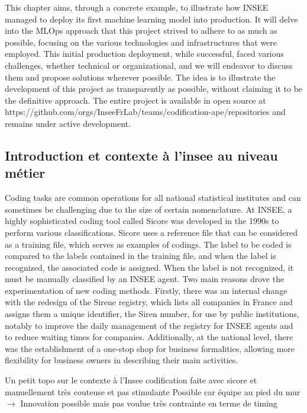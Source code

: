 This chapter aims, through a concrete example, to illustrate how INSEE managed to deploy its first machine learning model into production. It will delve into the MLOps approach that this project strived to adhere to as much as possible, focusing on the various technologies and infrastructures that were employed. This initial production deployment, while successful, faced various challenges, whether technical or organizational, and we will endeavor to discuss them and propose solutions wherever possible. The idea is to illustrate the development of this project as transparently as possible, without claiming it to be the definitive approach. The entire project is available in open source at https://github.com/orgs/InseeFrLab/teams/codification-ape/repositories and remains under active development.

\subsection{Introduction et contexte à l'insee au niveau métier}

Coding tasks are common operations for all national statistical institutes and can sometimes be challenging due to the size of certain nomenclature. At INSEE, a highly sophisticated coding tool called Sicore was developed in the 1990s to perform various classifications. Sicore uses a reference file that can be considered as a training file, which serves as examples of codings. The label to be coded is compared to the labels contained in the training file, and when the label is recognized, the associated code is assigned. When the label is not recognized, it must be manually classified by an INSEE agent. Two main reasons drove the experimentation of new coding methods. Firstly, there was an internal change with the redesign of the Sirene registry, which lists all companies in France and assigns them a unique identifier, the Siren number, for use by public institutions, notably to improve the daily management of the registry for INSEE agents and to reduce waiting times for companies. Additionally, at the national level, there was the establishment of a one-stop shop for business formalities, allowing more flexibility for business owners in describing their main activities.



Un petit topo sur le contexte à l'Insee codification faite avec sicore et manuellement très couteuse et pas stimulante
Possible car équipe au pied du mur $\rightarrow$ Innovation possible mais pas voulue très contrainte en terme de timing

